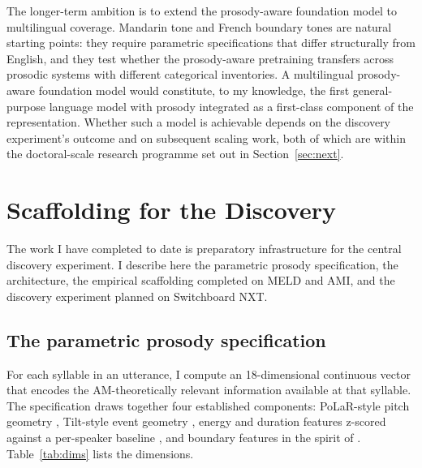 \documentclass[11pt,letterpaper]{article}
\begin{document}
The longer-term ambition is to extend the prosody-aware foundation model to multilingual coverage. Mandarin tone and French boundary tones are natural starting points: they require parametric specifications that differ structurally from English, and they test whether the prosody-aware pretraining transfers across prosodic systems with different categorical inventories. A multilingual prosody-aware foundation model would constitute, to my knowledge, the first general-purpose language model with prosody integrated as a first-class component of the representation. Whether such a model is achievable depends on the discovery experiment's outcome and on subsequent scaling work, both of which are within the doctoral-scale research programme set out in Section~\ref{sec:next}.

\section{Scaffolding for the Discovery}\label{sec:scaffolding}

The work I have completed to date is preparatory infrastructure for the central discovery experiment. I describe here the parametric prosody specification, the architecture, the empirical scaffolding completed on MELD and AMI, and the discovery experiment planned on Switchboard NXT.

\subsection{The parametric prosody specification}

For each syllable in an utterance, I compute an 18-dimensional continuous vector that encodes the AM-theoretically relevant information available at that syllable. The specification draws together four established components: PoLaR-style pitch geometry \citep{mahrt2018polar}, Tilt-style event geometry \citep{taylor2000tilt}, energy and duration features z-scored against a per-speaker baseline \citep{honorof2005}, and boundary features in the spirit of \citet{wightman1992boundary}. Table~\ref{tab:dims} lists the dimensions.
\end{document}
